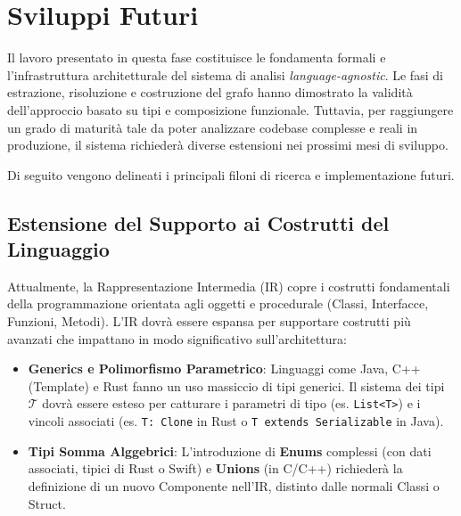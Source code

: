 \chapter{Sviluppi Futuri}

Il lavoro presentato in questa fase costituisce le fondamenta formali e l'infrastruttura architetturale del sistema di analisi \textit{language-agnostic}. Le fasi di estrazione, risoluzione e costruzione del grafo hanno dimostrato la validità dell'approccio basato su tipi e composizione funzionale. Tuttavia, per raggiungere un grado di maturità tale da poter analizzare codebase complesse e reali in produzione, il sistema richiederà diverse estensioni nei prossimi mesi di sviluppo.

Di seguito vengono delineati i principali filoni di ricerca e implementazione futuri.

\section{Estensione del Supporto ai Costrutti del Linguaggio}
Attualmente, la Rappresentazione Intermedia (IR) copre i costrutti fondamentali della programmazione orientata agli oggetti e procedurale (Classi, Interfacce, Funzioni, Metodi). L'IR dovrà essere espansa per supportare costrutti più avanzati che impattano in modo significativo sull'architettura:
\begin{itemize}
    \item \textbf{Generics e Polimorfismo Parametrico}: Linguaggi come Java, C++ (Template) e Rust fanno un uso massiccio di tipi generici. Il sistema dei tipi $\mathcal{T}$ dovrà essere esteso per catturare i parametri di tipo (es. \texttt{List<T>}) e i vincoli associati (es. \texttt{T: Clone} in Rust o \texttt{T extends Serializable} in Java).
    \item \textbf{Tipi Somma Alggebrici}: L'introduzione di \textbf{Enums} complessi (con dati associati, tipici di Rust o Swift) e \textbf{Unions} (in C/C++) richiederà la definizione di un nuovo Componente nell'IR, distinto dalle normali Classi o Struct.
\end{itemize}

